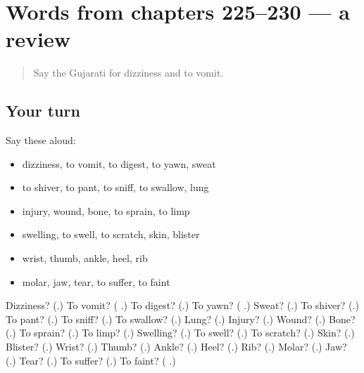 \section[(dialogue)]{Words from chapters 225–230 — a review}

\label{lesson:GU-R230-review-225-230}



\begin{quote}
Say the Gujarati for dizziness and to vomit.
\end{quote}

\subsection*{Your turn}
Say these aloud:

\begin{itemize}
\raggedright
  \item dizziness, to vomit, to digest, to yawn, sweat
  \item to shiver, to pant, to sniff, to swallow, lung
  \item injury, wound, bone, to sprain, to limp
  \item swelling, to swell, to scratch, skin, blister
  \item wrist, thumb, ankle, heel, rib
  \item molar, jaw, tear, to suffer, to faint
\end{itemize}

\begin{tcolorbox}[breakable,colback=teal!4,colframe=teal!35!black,title={Before you move on}]
Dizziness? (\textbf{}.) To vomit? (\textbf{ }.) To digest? (\textbf{}.) To yawn? (\textbf{ }.) Sweat? (\textbf{}.) To shiver? (\textbf{}.) To pant? (\textbf{}.) To sniff? (\textbf{}.) To swallow? (\textbf{}.) Lung? (\textbf{}.) Injury? (\textbf{}.) Wound? (\textbf{}.) Bone? (\textbf{}.) To sprain? (\textbf{}.) To limp? (\textbf{}.) Swelling? (\textbf{}.) To swell? (\textbf{}.) To scratch? (\textbf{}.) Skin? (\textbf{}.) Blister? (\textbf{}.) Wrist? (\textbf{}.) Thumb? (\textbf{}.) Ankle? (\textbf{}.) Heel? (\textbf{}.) Rib? (\textbf{}.) Molar? (\textbf{}.) Jaw? (\textbf{}.) Tear? (\textbf{}.) To suffer? (\textbf{}.) To faint? (\textbf{ }.)
\end{tcolorbox}

